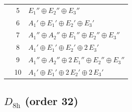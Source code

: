 \documentclass[11pt]{article}
\begin{document}
\begin{longtable}{l c p{}}
 & 5 & $E_{1}''\oplus E_{2}''\oplus E_{3}''$\\
 & 6 & $A_{1}'\oplus E_{1}'\oplus E_{2}'\oplus E_{3}'$\\
 & 7 & $A_{1}''\oplus A_{2}''\oplus E_{1}''\oplus E_{2}''\oplus E_{3}''$\\
 & 8 & $A_{1}'\oplus E_{1}'\oplus E_{2}'\oplus 2\,E_{3}'$\\
 & 9 & $A_{1}''\oplus A_{2}''\oplus 2\,E_{1}''\oplus E_{2}''\oplus E_{3}''$\\
 & 10 & $A_{1}'\oplus E_{1}'\oplus 2\,E_{2}'\oplus 2\,E_{3}'$\\
\hline
\end{longtable}

\subsection*{$D_{8\mathrm{h}}$ \quad (order 32)}
\end{document}
